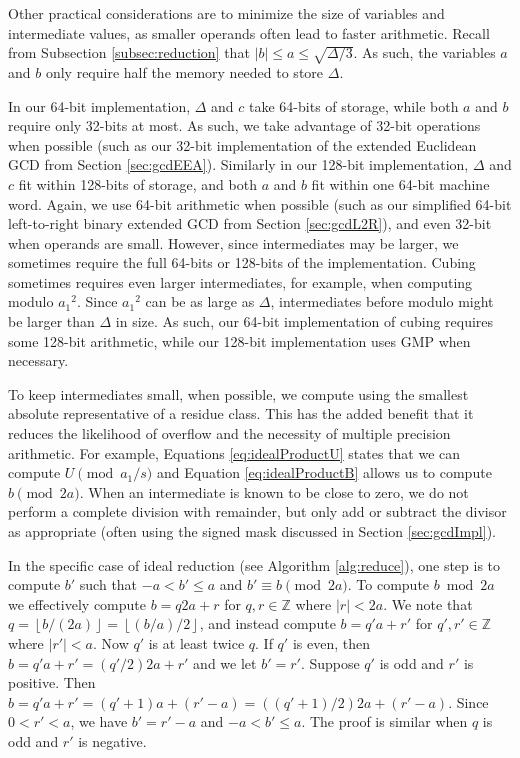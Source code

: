 \documentclass{ucalgthes1}
\theoremstyle{definition}
\newcommand{\ZZ}{\mathbb{Z}}
\newcommand{\floor}[1]{\left\lfloor #1 \right\rfloor}
\begin{document}
Other practical considerations are to minimize the size of variables and intermediate values, as smaller operands often lead to faster arithmetic.  Recall from Subsection \ref{subsec:reduction} that $|b| \le a \le \sqrt{\Delta/3}$.  As such, the variables $a$ and $b$ only require half the memory needed to store $\Delta$.

In our 64-bit implementation, $\Delta$ and $c$ take 64-bits of storage, while both $a$ and $b$ require only 32-bits at most.  As such, we take advantage of 32-bit operations when possible (such as our 32-bit implementation of the extended Euclidean GCD from Section \ref{sec:gcdEEA}).  Similarly in our 128-bit implementation, $\Delta$ and $c$ fit within 128-bits of storage, and both $a$ and $b$ fit within one 64-bit machine word.  Again, we use 64-bit arithmetic when possible (such as our simplified 64-bit left-to-right binary extended GCD from Section \ref{sec:gcdL2R}), and even 32-bit when operands are small.  However, since intermediates may be larger, we sometimes require the full 64-bits or 128-bits of the implementation.  Cubing sometimes requires even larger intermediates, for example, when computing modulo ${a_1}^2$.  Since ${a_1}^2$ can be as large as $\Delta$, intermediates before modulo might be larger than $\Delta$ in size.  As such, our 64-bit implementation of cubing requires some 128-bit arithmetic, while our 128-bit implementation uses GMP when necessary.

To keep intermediates small, when possible, we compute using the smallest absolute representative of a residue class.  This has the added benefit that it reduces the likelihood of overflow and the necessity of multiple precision arithmetic.  For example, Equations \ref{eq:idealProductU} states that we can compute $U \pmod {a_1/s}$ and Equation \ref{eq:idealProductB} allows us to compute $b \pmod{2a}$.  When an intermediate is known to be close to zero, we do not perform a complete division with remainder, but only add or subtract the divisor as appropriate (often using the signed mask discussed in Section \ref{sec:gcdImpl}).

In the specific case of ideal reduction (see Algorithm \ref{alg:reduce}), one step is to compute $b'$ such that $-a < b' \le a$ and $b' \equiv b \pmod{2a}$.  To compute $b \bmod{2a}$ we effectively compute $b = q2a + r$ for $q, r \in \ZZ$ where $|r| < 2a$.  We note that $q = \floor{b/(2a)} = \floor{(b/a)/2}$, and instead compute $b = q'a+r'$ for $q', r' \in \ZZ$ where $|r'| < a$.  Now $q'$ is at least twice $q$.  If $q'$ is even, then $b = q'a + r' = (q'/2)2a + r'$ and we let $b' = r'$. Suppose $q'$ is odd and $r'$ is positive.  Then $b = q'a + r' = (q' + 1)a + (r' - a) = ((q' + 1)/2)2a + (r' - a)$.  Since $0 < r' < a$, we have $b' = r' - a$ and $-a < b' \le a$.  The proof is similar when $q$ is odd and $r'$ is negative.
\end{document}
